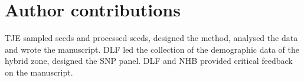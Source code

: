 \documentclass[10pt, a4paper, twocolumn]{article} %
\begin{document}
\section{Author contributions}

TJE sampled seeds and processed seeds, designed the method, analysed the data and wrote the manuscript.
DLF led the collection of the demographic data of the hybrid zone, designed the SNP panel.
DLF and NHB provided critical feedback on the manuscript. 

\printbibliography[title={Bibliography}] %
% 
\end{document}
